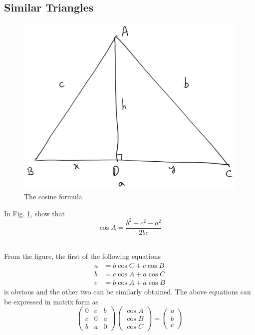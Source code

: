 \subsection{Similar Triangles}
\begin{figure}[!h]
	\begin{center}
		
		\includegraphics[width=\columnwidth]{./figs/ch2_triang_ar}
		\vspace*{-10cm}
	\end{center}
	\caption{The cosine formula}
	\label{ch2_cosine_formula}	
\end{figure}
\begin{problem}
In Fig. \ref{ch2_cosine_formula}, show that
%
\begin{equation}
\cos A = \frac{b^2+c^2-a^2}{2bc}
\end{equation}
%
\
\end{problem}
\proof From the figure, the first of the following equations
%
\begin{align}
a &= b \cos C + c \cos B \\
b &= c \cos A + a \cos C \\
c &= b \cos A + a \cos B
\end{align}
%
is obvious and the other two can be similarly obtained.  The above equations can be expressed in matrix form as
%
\begin{equation}
\begin{pmatrix}
0 & c & b \\
c & 0 & a \\
b & a & 0
\end{pmatrix}
\begin{pmatrix}
\cos A \\
\cos B \\
\cos C
\end{pmatrix}
= 
\begin{pmatrix}
a\\
b\\
c
\end{pmatrix}
\end{equation}
